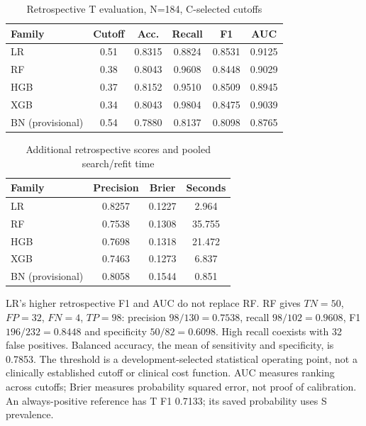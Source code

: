 \documentclass[conference]{IEEEtran}
\begin{document}
\begin{table}[ht]\centering\caption{Retrospective T evaluation, N=184, C-selected cutoffs}
\setlength{\tabcolsep}{3pt}\begin{tabular}{lccccc}\toprule Family & Cutoff & Acc. & Recall & F1 & AUC\\\midrule
LR & 0.51 & 0.8315 & 0.8824 & 0.8531 & 0.9125\\
RF & 0.38 & 0.8043 & 0.9608 & 0.8448 & 0.9029\\
HGB & 0.37 & 0.8152 & 0.9510 & 0.8509 & 0.8945\\
XGB & 0.34 & 0.8043 & 0.9804 & 0.8475 & 0.9039\\
BN (provisional) & 0.54 & 0.7880 & 0.8137 & 0.8098 & 0.8765\\
\bottomrule\end{tabular}\end{table}
\begin{table}[ht]\centering\caption{Additional retrospective scores and pooled search/refit time}
\begin{tabular}{lccc}\toprule Family & Precision & Brier & Seconds\\\midrule
LR & 0.8257 & 0.1227 & 2.964\\
RF & 0.7538 & 0.1308 & 35.755\\
HGB & 0.7698 & 0.1318 & 21.472\\
XGB & 0.7463 & 0.1273 & 6.837\\
BN (provisional) & 0.8058 & 0.1544 & 0.851\\
\bottomrule\end{tabular}\end{table}
LR's higher retrospective F1 and AUC do not replace RF. RF gives $TN=50$, $FP=32$, $FN=4$, $TP=98$: precision $98/130=0.7538$, recall $98/102=0.9608$, F1 $196/232=0.8448$ and specificity $50/82=0.6098$. High recall coexists with 32 false positives. Balanced accuracy, the mean of sensitivity and specificity, is 0.7853. The threshold is a development-selected statistical operating point, not a clinically established cutoff or clinical cost function. AUC measures ranking across cutoffs; Brier measures probability squared error, not proof of calibration. An always-positive reference has T F1 0.7133; its saved probability uses S prevalence.
\end{document}
